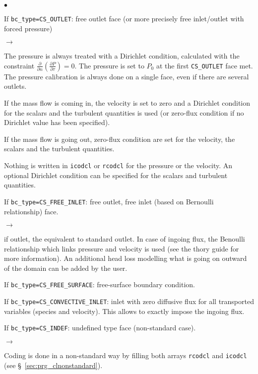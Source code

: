 \begin{list}{$\bullet$}{}
\item If \texttt{bc\_type=CS\_OUTLET}: free outlet face (or more precisely free
      inlet/outlet with forced pressure)
\begin{list}{$\rightarrow$}{}
\item The pressure is always treated with a Dirichlet condition, calculated
      with the constraint $\displaystyle \frac{\partial }{\partial n}\left(\frac{ \partial P}{\partial \tau}\right)=0$.
      The pressure is set to $P_0$ at the first \texttt{CS\_OUTLET} face met.
      The pressure calibration is always done on a single face, even if there are
      several outlets.
\item If the mass flow is coming in, the velocity is set to zero
      and a Dirichlet condition for the scalars and the turbulent quantities is used
      (or zero-flux condition if no Dirichlet value has been specified).
\item If the mass flow is going out, zero-flux condition are set for the velocity,
      the scalars and the turbulent quantities.
\item Nothing is written in \texttt{icodcl} or \texttt{rcodcl} for the pressure or
      the velocity. An optional Dirichlet condition can be specified for the scalars
      and turbulent quantities.
\end{list}

\item If \texttt{bc\_type=CS\_FREE\_INLET}: free outlet, free inlet (based on Bernoulli relationship) face.

\begin{list}{$\rightarrow$}{}
\item if outlet, the equivalent to standard outlet.
      In case of ingoing flux, the Benoulli relationship which links pressure and velocity is used (see the thory guide for more information). An additional head loss modelling what is going on outward of the domain can be added by the user.
\end{list}

\item If \texttt{bc\_type=CS\_FREE\_SURFACE}: free-surface boundary condition.

\item If \texttt{bc\_type=CS\_CONVECTIVE\_INLET}: inlet with zero diffusive flux for all transported variables (species and velocity). This allows to exactly impose the ingoing flux.

\item If \texttt{bc\_type=CS\_INDEF}: undefined type face (non-standard case).
\begin{list}{$\rightarrow$}{}
\item Coding is done in a non-standard way by filling both arrays \texttt{rcodcl} and
      \texttt{icodcl} (see \S~\ref{sec:prg_clnonstandard}).
\end{list}
\end{list}

